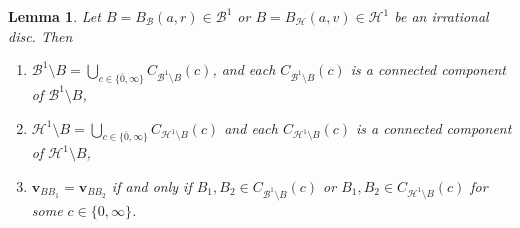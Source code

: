 \documentclass[10pt]{article}
\newtheorem{lemma}[theorem]{Lemma}
\theoremstyle{definition}
\renewcommand{\vec}[1]{\mathbf{#1}}
\begin{document}
\begin{lemma}
  \label{lem:tangentDirectionsIrrational}
  Let $B=B_{\mathcal{B}}(a,r)\in\mathcal B^1$ or $B=B_{\mathcal{H}}(a,v)\in\mathcal H^1$ be an irrational disc.  Then
  \begin{enumerate}
  \item[(i)] $\mathcal B^1\setminus B = \bigcup_{c\in\{\bar 0,\infty\}} C_{\mathcal B^1\setminus B}(c)$, and each $C_{\mathcal B^1\setminus B}(c)$ is a connected component of $\mathcal B^1\setminus B$,
  \item[(ii)] $\mathcal H^1\setminus B = \bigcup_{c\in\{\bar 0,\infty\}} C_{\mathcal H^1\setminus B}(c)$ and each $C_{\mathcal H^1\setminus B}(c)$ is a connected component of $\mathcal H^1\setminus B$,
  \item[(iii)] $\vec{v}_{BB_1}=\vec{v}_{BB_2}$ if and only if $B_1,B_2\in C_{\mathcal B^1\setminus B}(c)$ or $B_1,B_2\in C_{\mathcal H^1\setminus B}(c)$ for some $c\in\{0,\infty\}$.
  \end{enumerate}
\end{lemma}
\end{document}
